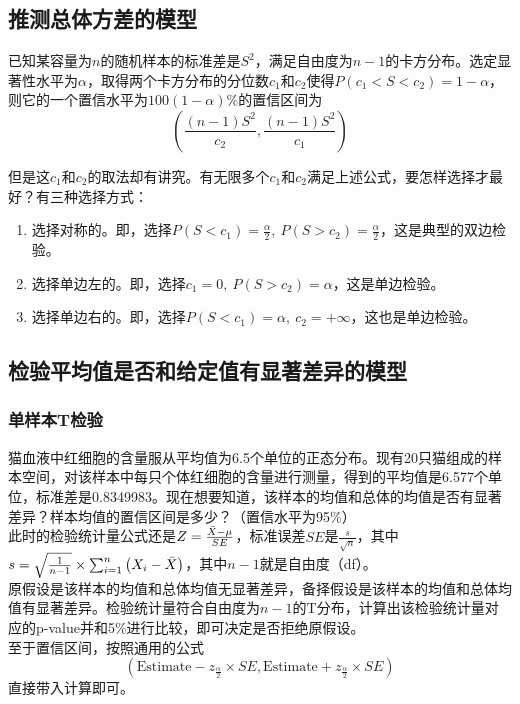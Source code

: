\documentclass[UTF8]{ctexbook}
\begin{document}
\subsection{推测总体方差的模型}
已知某容量为$n$的随机样本的标准差是$S^2$，满足自由度为$n-1$的卡方分布。选定显著性水平为$\alpha$，取得两个卡方分布的分位数$c_1$和$c_2$使得$P(c_1<S<c_2)=1-\alpha$，则它的一个置信水平为$100(1-\alpha)\%$的置信区间为
\[
	\left(\frac{(n-1)S^2}{c_2},\frac{(n-1)S^2}{c_1}\right)
\]

但是这$c_1$和$c_2$的取法却有讲究。有无限多个$c_1$和$c_2$满足上述公式，要怎样选择才最好？有三种选择方式：

\begin{enumerate}
  \item 选择对称的。即，选择$P(S<c_1)=\frac{\alpha}{2},\ P(S>c_2)=\frac{\alpha}{2}$，这是典型的双边检验。
  \item 选择单边左的。即，选择$c_1=0,\ P(S>c_2)=\alpha$，这是单边检验。
  \item 选择单边右的。即，选择$P(S<c_1)=\alpha,\ c_2=+\infty$，这也是单边检验。
\end{enumerate}

\subsection{检验平均值是否和给定值有显著差异的模型}
\subsubsection{单样本T检验}
猫血液中红细胞的含量服从平均值为6.5个单位的正态分布。现有20只猫组成的样本空间，对该样本中每只个体红细胞的含量进行测量，得到的平均值是6.577个单位，标准差是0.8349983。现在想要知道，该样本的均值和总体的均值是否有显著差异？样本均值的置信区间是多少？（置信水平为95\%）\\
\indent 此时的检验统计量公式还是$Z=\frac{\Bar{X}-\mu}{SE}$，标准误差$SE$是$\frac{s}{\sqrt{n}}$，其中$s=\sqrt{\frac{1}{n-1}}\times \sum_{i=1}^n\left(X_i-\Bar{X}\right)$，其中$n-1$就是自由度（df）。\\
\indent 原假设是该样本的均值和总体均值无显著差异，备择假设是该样本的均值和总体均值有显著差异。检验统计量符合自由度为$n-1$的T分布，计算出该检验统计量对应的p-value并和5\%进行比较，即可决定是否拒绝原假设。\\
\indent 至于置信区间，按照通用的公式
\[
\left(\text{Estimate}-z_{\frac{\alpha}{2}}\times SE,\text{Estimate}+z_{\frac{\alpha}{2}}\times SE\right)
\]
直接带入计算即可。
\end{document}
